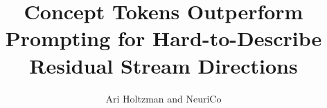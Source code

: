 \documentclass{article}
\title{Concept Tokens Outperform Prompting for Hard-to-Describe\\Residual Stream Directions}
\author{Ari Holtzman and NeuriCo}
\begin{document}
\maketitle

\begin{abstract}

\end{abstract}










\end{document}
